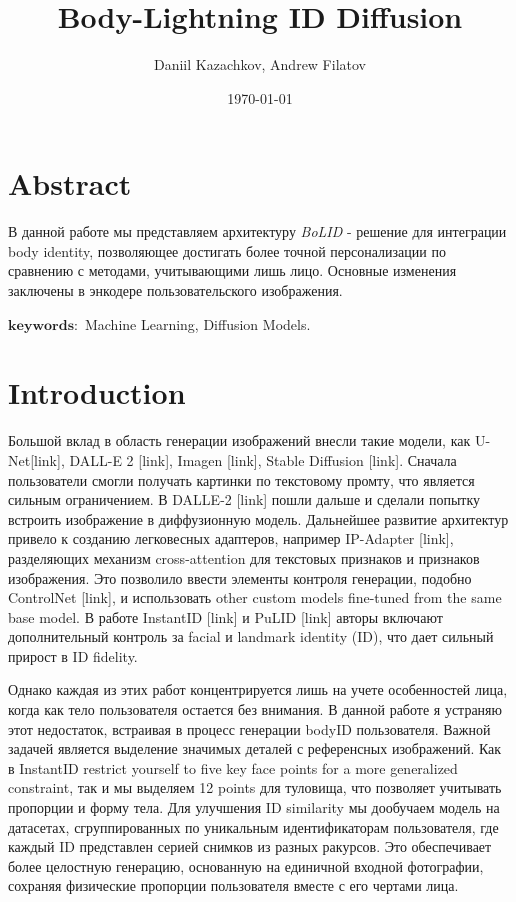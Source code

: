 \documentclass[a4paper,14pt]{article}
\author{Daniil Kazachkov, Andrew Filatov}
\title{\textbf{Body-Lightning ID Diffusion}}
\date{\today}
\theoremstyle{plain} %
\theoremstyle{definition} %
\theoremstyle{remark} %
\begin{document}
	\maketitle
	\section{Abstract}

		В данной работе мы представляем архитектуру \textit{BoLID} - решение для интеграции body identity, позволяющее достигать более точной персонализации по сравнению с методами, учитывающими лишь лицо.
		Основные изменения заключены в энкодере пользовательского изображения.

	$\mathbf{keywords:}$ Machine Learning, Diffusion Models.

	\section{Introduction}
		Большой вклад в область генерации изображений внесли такие модели, как U-Net[link], DALL-E 2 [link], Imagen [link], Stable Diffusion [link].
		Сначала пользователи смогли получать картинки по текстовому промту, что является сильным ограничением. В DALLE-2 [link] пошли дальше и сделали попытку встроить изображение в диффузионную модель.
		Дальнейшее развитие архитектур привело к созданию легковесных адаптеров, например IP-Adapter [link], разделяющих механизм cross-attention для текстовых
		признаков и признаков изображения. Это позволило ввести элементы контроля генерации, подобно ControlNet [link], и использовать other custom models fine-tuned from the same base model.
		В работе InstantID [link] и PuLID [link] авторы включают дополнительный контроль за facial и landmark identity (ID), что дает сильный прирост в ID fidelity.

		Однако каждая из этих работ концентрируется лишь на учете особенностей лица, когда как тело пользователя остается без внимания.
		В данной работе я устраняю этот недостаток, встраивая в процесс генерации bodyID пользователя. Важной задачей является выделение значимых деталей с референсных изображений.
		Как в InstantID restrict yourself	to five key face points for a more generalized constraint, так и мы выделяем 12 points для туловища, что позволяет учитывать пропорции и форму тела.
		Для улучшения ID similarity мы дообучаем модель на датасетах, сгруппированных по уникальным идентификаторам пользователя, где каждый ID представлен серией снимков из разных ракурсов.
		Это обеспечивает более целостную генерацию, основанную на единичной входной фотографии, сохраняя физические пропорции пользователя вместе с его чертами лица.
\end{document}
